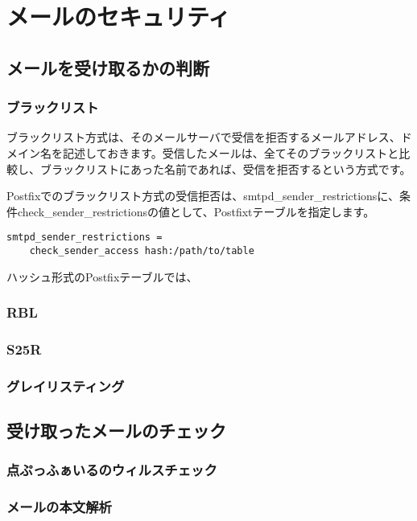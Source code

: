 \chapter{メールのセキュリティ}

\section{メールを受け取るかの判断}

\subsection{ブラックリスト}

ブラックリスト方式は、そのメールサーバで受信を拒否するメールアドレス、ドメイン名を記述しておきます。受信したメールは、全てそのブラックリストと比較し、ブラックリストにあった名前であれば、受信を拒否するという方式です。

Postfixでのブラックリスト方式の受信拒否は、smtpd\_sender\_restrictionsに、条件check\_sender\_restrictionsの値として、Postfixtテーブルを指定します。

\begin{verbatim}
smtpd_sender_restrictions = 
    check_sender_access hash:/path/to/table
\end{verbatim}

ハッシュ形式のPostfixテーブルでは、

\subsection{RBL}

\subsection{S25R}

\subsection{グレイリスティング}

\section{受け取ったメールのチェック}

\subsection{点ぷっふぁいるのウィルスチェック}

\subsection{メールの本文解析}